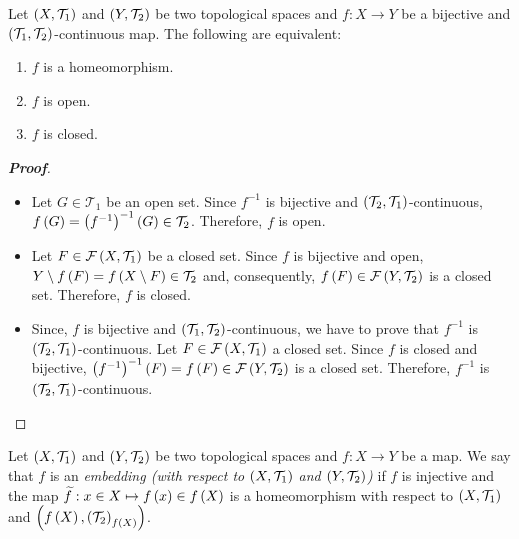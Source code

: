 \begin{proposition}\label{Characterization of homeomorphisms}
  Let $\left(X,\mathcal{T}_1\right)$ and $\left(Y,\mathcal{T}_2\right)$ be two topological spaces and $f:X\rightarrow Y$ be a bijective and $\left(\mathcal{T}_1,\mathcal{T}_2\right)$-continuous map. The following are equivalent:

  \begin{enumerate}
    \item $f$ is a homeomorphism.
    \item $f$ is open.
    \item $f$ is closed.
  \end{enumerate}

  \begin{proof}[\rm\textbf{Proof}]
    \hfill
    \begin{itemize}
      \item[\boxed{1\Rightarrow2}] Let $G\in\mathcal{T}_1$ be an open set. Since $f^{-1}$ is bijective and $\left(\mathcal{T}_2,\mathcal{T}_1\right)$-continuous, $f\left(G\right)=\left(f^{-1}\right)^{-1}\left(G\right)\in\mathcal{T}_2$. Therefore, $f$ is open.
      \item[\boxed{2\Rightarrow3}] Let $F\in\mathcal{F}\left(X,\mathcal{T}_1\right)$ be a closed set. Since $f$ is bijective and open, $Y\setminus f\left(F\right)=f\left(X\setminus F\right)\in\mathcal{T}_2$ and, consequently, $f\left(F\right)\in\mathcal{F}\left(Y,\mathcal{T}_2\right)$ is a closed set. Therefore, $f$ is closed.
      \item[\boxed{3\Rightarrow1}] Since, $f$ is bijective and $\left(\mathcal{T}_1,\mathcal{T}_2\right)$-continuous, we have to prove that $f^{-1}$ is $\left(\mathcal{T}_2,\mathcal{T}_1\right)$-continuous. Let $F\in\mathcal{F}\left(X,\mathcal{T}_1\right)$ a closed set. Since $f$ is closed and bijective, $\left(f^{-1}\right)^{-1}\left(F\right)=f\left(F\right)\in\mathcal{F}\left(Y,\mathcal{T}_2\right)$ is a closed set. Therefore, $f^{-1}$ is $\left(\mathcal{T}_2,\mathcal{T}_1\right)$-continuous.
    \end{itemize}
  \end{proof}
\end{proposition}

\begin{definition}
  Let $\left(X,\mathcal{T}_1\right)$ and $\left(Y,\mathcal{T}_2\right)$ be two topological spaces and $f:X\rightarrow Y$ be a map. We say that $f$ is an \textit{embedding (with respect to $\left(X,\mathcal{T}_1\right)$ and $\left(Y,\mathcal{T}_2\right)$)} if $f$ is injective and the map $\widetilde{f}:x\in X\mapsto f\left(x\right)\in f\left(X\right)$ is a homeomorphism with respect to $\left(X,\mathcal{T}_1\right)$ and $\left(f\left(X\right),\left(\mathcal{T}_2\right)_{f\left(X\right)}\right)$.
\end{definition}

